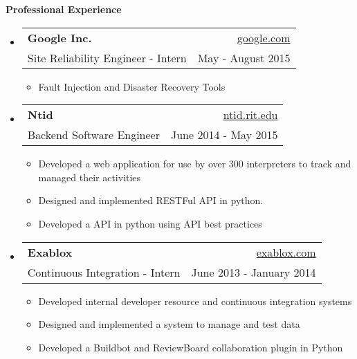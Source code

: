 \documentclass[letterpaper,11pt]{article}
\makeatletter
\newcommand{\resheading}[1]{{\large \colorbox{mygrey}{\begin{minipage}{\textwidth}{\textbf{#1 \vphantom{p\^{E}}}}\end{minipage}}}}
\newcommand{\ressubheading}[4]{
\begin{tabular*}{6.5in}{l@{\extracolsep{\fill}}r}
		\textbf{#1} & #2 \\
		{#3} & {#4} \\
\end{tabular*}\vspace{-6pt}}
\makeatother
\begin{document}
\resheading{Professional Experience}
{\footnotesize
	\begin{itemize}
		\item
                        \ressubheading{Google Inc.}{\href{http://www.google.com/}{google.com}}{Site Reliability Engineer - Intern}{May - August 2015}
                        { \footnotesize
                                \begin{itemize}
                                  \item{Fault Injection and Disaster Recovery Tools}
                                \end{itemize}
                        }

               \item
                        \ressubheading{Ntid}{\href{http://www.ntid.rit.edu/}{ntid.rit.edu}}{Backend Software Engineer}{June 2014 - May 2015}
                        { \footnotesize
                                \begin{itemize}
                                  \item{Developed a web application for use by over 300 interpreters to track and managed their activities}
                                  \item{Designed and implemented RESTFul API in python. }
                                  \item{Developed a API in python using API best practices}
                                \end{itemize}
                        }


	       \item
			\ressubheading{Exablox}{\href{http://www.exablox.com/}{exablox.com}}{Continuous Integration - Intern}{June 2013 - January 2014}
			{ \footnotesize
				\begin{itemize}
                                  \item{Developed internal developer resource and continuous integration systems}
				  \item{Designed and implemented a system to manage and test data}
				  \item{Developed a Buildbot and ReviewBoard collaboration plugin in Python}
				\end{itemize}
			}
	\end{itemize}  %
}
\end{document}
